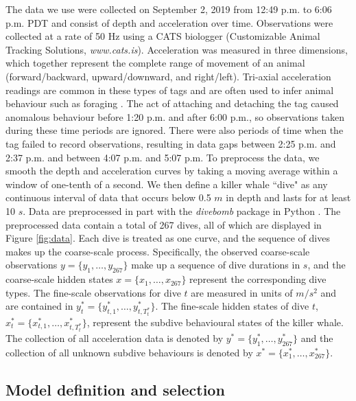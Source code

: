 The data we use were collected on September 2, 2019 from 12:49 p.m. to 6:06 p.m. PDT and consist of depth and acceleration over time. Observations were collected at a rate of 50 Hz using a CATS biologger (Customizable Animal Tracking Solutions, {\em{www.cats.is}}). Acceleration was measured in three dimensions, which together represent the complete range of movement of an animal (forward/backward, upward/downward, and right/left). Tri-axial acceleration readings are common in these types of tags and are often used to infer animal behaviour such as foraging \citep{Fehlmann:2017,Wright:2017,Cade:2017}. The act of attaching and detaching the tag caused anomalous behaviour before 1:20 p.m. and after 6:00 p.m., so observations taken during these time periods are ignored. There were also periods of time when the tag failed to record observations, resulting in data gaps between 2:25 p.m. and 2:37 p.m. and between 4:07 p.m. and 5:07 p.m. To preprocess the data, we smooth the depth and acceleration curves by taking a moving average within a window of one-tenth of a second. We then define a killer whale ``dive" as any continuous interval of data that occurs below 0.5 $m$ in depth and lasts for at least 10 $s$. Data are preprocessed in part with the \textit{divebomb} package in Python \citep{Nunes:2018}. The preprocessed data contain a total of 267 dives, all of which are displayed in Figure \ref{fig:data}. Each dive is treated as one curve, and the sequence of dives makes up the coarse-scale process. Specifically, the observed coarse-scale observations $y = \big\{y_1,\ldots,y_{267}\big\}$ make up a sequence of dive durations in $s$, and the coarse-scale hidden states $x = \big\{x_1,\ldots,x_{267}\big\}$ represent the corresponding dive types. The fine-scale observations for dive $t$ are measured in units of $m/s^2$ and are contained in $y^*_{t} = \big\{y^*_{t,1},\ldots,y^*_{t,T^*_t} \big\}$. The fine-scale hidden states of dive $t$, $x^*_{t} = \big\{x^*_{t,1},\ldots,x^*_{t,T^*_t} \big\}$, represent the subdive behavioural states of the killer whale. The collection of all acceleration data is denoted by $y^* = \big\{y^*_1,\ldots,y^*_{267}\big\}$ and the collection of all unknown subdive behaviours is denoted by $x^* = \big\{x^*_1,\ldots,x^*_{267}\big\}$.

\subsection{Model definition and selection}
\label{subsec:model_selection}


